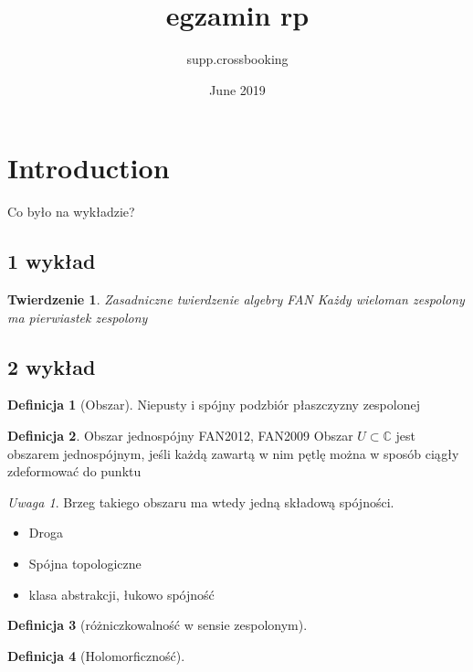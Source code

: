 \documentclass{article}
\title{egzamin rp}
\author{supp.crossbooking }
\date{June 2019}
\theoremstyle{plain}
\newtheorem*{theorem}{Twierdzenie}
\theoremstyle{definition}
\newtheorem*{definition}{Definicja}
\theoremstyle{remark}
\newtheorem*{remark}{Uwaga}
\begin{document}
\maketitle
{\small\listoftheorems[ignoreall,onlynamed={theorem,definition,remark,corollary}]}

\section{Introduction}
Co było na wykładzie?
\subsection{1 wykład}
\begin{theorem}{Zasadniczne twierdzenie algebry FAN}
Każdy wieloman zespolony ma pierwiastek zespolony 
\end{theorem}

\subsection{2 wykład}
\begin{definition}[Obszar]
Niepusty i spójny podzbiór płaszczyzny zespolonej
\end{definition}

\begin{definition}{Obszar jednospójny FAN2012, FAN2009}
Obszar $U \subset \mathbb{C}$ jest obszarem jednospójnym, jeśli każdą zawartą w nim pętlę można w sposób ciągły zdeformować do punktu
\end{definition}

\begin{remark}
Brzeg takiego obszaru ma wtedy jedną składową spójności.
\end{remark}

\begin{itemize}
    \item Droga
    \item Spójna topologiczne
    \item klasa abstrakcji, łukowo spójność
\end{itemize}{}

\begin{definition}[różniczkowalność w sensie zespolonym]

\end{definition}{}

\begin{definition}[Holomorficzność]

\end{definition}{}
\end{document}
